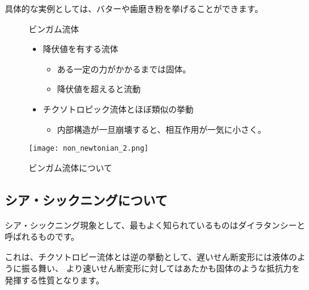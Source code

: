 \documentclass[uplatex,dvipdfmx,a4paper,11pt]{jsreport}
\begin{document}
具体的な実例としては、バターや歯磨き粉を挙げることができます。
\begin{figure}[htb]
	\begin{center}
		\begin{minipage}{0.5\textwidth}
			\begin{itembox}[l]{ビンガム流体}
				\begin{itemize}
					\item 降伏値を有する流体
					\begin{itemize}
						\item ある一定の力がかかるまでは固体。
						\item 降伏値を超えると流動
					\end{itemize}
					\item チクソトロピック流体とほぼ類似の挙動
					\begin{itemize}
						\item 内部構造が一旦崩壊すると、相互作用が一気に小さく。
					\end{itemize}
				\end{itemize}
			\end{itembox}
			
		\end{minipage}
		\begin{minipage}{0.4\textwidth}
			\begin{center}
			\texttt{[image: non\_newtonian\_2.png]}
			\end{center}
		\end{minipage}
		\caption{ビンガム流体について}
		\label{fig:bingham}
	\end{center}
\end{figure}

\subsection{シア・シックニングについて}

シア・シックニング現象として、最もよく知られているものはダイラタンシーと呼ばれるものです。

これは、チクソトロピー流体とは逆の挙動として、遅いせん断変形には液体のように振る舞い、
より速いせん断変形に対してはあたかも固体のような抵抗力を発揮する性質となります。
\end{document}
